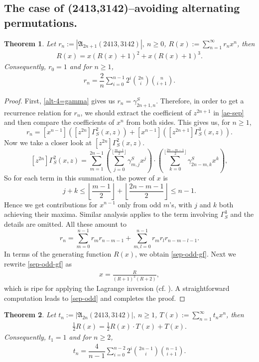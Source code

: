\documentclass[12pt,reqno]{amsart}
\numberwithin{equation}{section}
\theoremstyle{plain}
\newtheorem{theorem}{Theorem}[section]
\theoremstyle{definition}
\def\A{\mathfrak{A}}
\begin{document}
\subsection{The case of (2413,3142)--avoiding alternating permutations.}

\begin{theorem}\label{thm:alt-2413-odd}
Let $r_{n}:=|\A_{2n+1}(2413,3142)|,\:n\ge 0$, $R(x):=\sum\limits_{n=1}^{\infty}r_{n}x^n$, then
\begin{align}\label{sep-odd-gf}
R(x)=x(R(x)+1)^2+x(R(x)+1)^3.
\end{align}
Consequently, $r_0=1$ and for $n\ge 1$,
\begin{align}\label{sep-odd}
r_{n}=\dfrac{2}{n}\sum_{i=0}^{n-1}2^{i}\binom{2n}{i}\binom{n}{i+1}.
\end{align}
\end{theorem}
\begin{proof}
First, \eqref{alt-4=gamma} gives us $r_n=\gamma^S_{2n+1,n}$. Therefore, in order to get a recurrence relation for $r_n$, we should extract the coefficient of $z^{2n+1}$ in \eqref{ae-sep} and then compare the coefficients of $x^n$ from both sides. This gives us, for $n\ge 1$,
$$r_n=[x^{n-1}]\left([z^{2n}]\Gamma^2_S(x,z)\right)+[x^{n-1}]\left([z^{2n+1}]\Gamma^3_S(x,z)\right).$$
Now we take a closer look at $[z^{2n}]\Gamma^2_S(x,z)$.
$$[z^{2n}]\Gamma^2_S(x,z)=\sum_{m=1}^{2n-1}\left(\sum_{j=0}^{\lfloor\frac{m-1}{2}\rfloor}\gamma^S_{m,j}x^j\right)\cdot\left(\sum_{k=0}^{\lfloor\frac{2n-m-1}{2}\rfloor}\gamma^S_{2n-m,k}x^k\right),$$
So for each term in this summation, the power of $x$ is $$j+k\le\left\lfloor\frac{m-1}{2}\right\rfloor+\left\lfloor\frac{2n-m-1}{2}\right\rfloor\le n-1.$$
Hence we get contributions for $x^{n-1}$ only from odd $m$'s, with $j$ and $k$ both achieving their maxima. Similar analysis applies to the term involving $\Gamma^3_S$ and the details are omitted. All these amount to
$$r_n=\sum_{m=0}^{n-1}r_mr_{n-m-1}+\sum_{m,l=0}^{n-1}r_mr_lr_{n-m-l-1}.$$
In terms of the generating function $R(x)$, we obtain \eqref{sep-odd-gf}. Next we rewrite \eqref{sep-odd-gf} as
\begin{align}\label{sep-even-lag}
x=\frac{R}{(R+1)^2(R+2)},
\end{align}
which is ripe for applying the Lagrange inversion (cf. \cite{FSe}). A straightforward computation leads to \eqref{sep-odd} and completes the proof.
\end{proof}

\begin{theorem}
Let $t_n:=|\A_{2n}(2413,3142)|,\:n\ge 1$, $T(x):=\sum\limits_{n=1}^{\infty}t_nx^n$, then
\begin{align}\label{sep-even-gf}
\frac{1}{2}R(x)=\frac{1}{2}R(x)\cdot T(x)+T(x).
\end{align}
Consequently, $t_1=1$ and for $n\ge 2$,
\begin{align}\label{sep-even}
t_{n}=\dfrac{4}{n-1}\sum_{i=0}^{n-2}2^{i}\binom{2n-1}{i}\binom{n-1}{i+1}.
\end{align}
\end{theorem}
\end{document}
